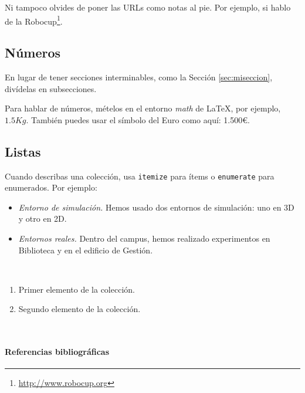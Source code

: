 Ni tampoco olvides de poner las URLs como notas al pie. Por ejemplo, si hablo de la Robocup\footnote{\url{http://www.robocup.org}}.

\subsection{Números}
\label{sec:subseccion}

En lugar de tener secciones interminables, como la Sección \ref{sec:miseccion}, divídelas en subsecciones.

Para hablar de números, mételos en el entorno \textit{math} de \LaTeX, por ejemplo, $1.5Kg$. También puedes usar el símbolo del Euro como aquí: 1.500\euro.

\subsection{Listas}

Cuando describas una colección, usa \texttt{itemize} para ítems o \texttt{enumerate} para enumerados. Por ejemplo:

\begin{itemize}
 \item \textit{Entorno de simulación.} Hemos usado dos entornos de simulación: uno en 3D y otro en 2D.
 \item \textit{Entornos reales.} Dentro del campus, hemos realizado experimentos en Biblioteca y en el edificio de Gestión.
\end{itemize}\

\begin{enumerate}
 \item Primer elemento de la colección.
 \item Segundo elemento de la colección.
\end{enumerate}\

\paragraph{Referencias bibliográficas}
\label{sec:referencias}


